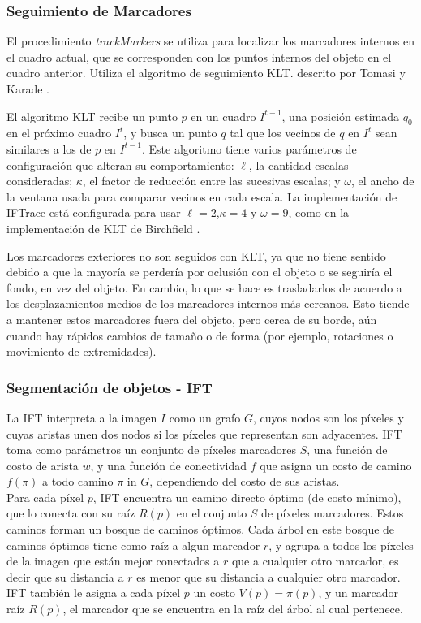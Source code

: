 \documentclass[a4paper,10pt]{article}
\begin{document}
\subsubsection{Seguimiento de Marcadores}

El procedimiento \textit{trackMarkers} se utiliza para localizar los marcadores
internos en el cuadro actual, que se corresponden con los puntos internos del objeto
en el cuadro anterior. Utiliza el algoritmo de seguimiento KLT. descrito por Tomasi y
Karade \cite{Tomasi91detectionand}.

El algoritmo KLT recibe un punto $p$ en un cuadro $I^{t-1}$, una posición estimada
$q_{0}$ en el próximo cuadro $I^{t}$, y busca un punto $q$ tal que los vecinos
de $q$ en $I^{t}$ sean similares a los de $p$ en $I^{t-1}$. Este algoritmo tiene
varios parámetros de configuración que alteran su comportamiento: $\ell$, la cantidad
escalas consideradas; $\kappa$, el factor de reducción entre las sucesivas escalas; y
$\omega$, el ancho de la ventana usada para comparar vecinos en cada escala.
La implementación de IFTrace está configurada para usar $\ell=2$,$\kappa=4$ y
$\omega=9$, como en la implementación de KLT de Birchfield \cite{Birchfield-KLT-implementation}.

Los marcadores exteriores no son seguidos con KLT, ya que no tiene sentido debido
a que la mayoría se perdería por oclusión con el objeto o se seguiría el fondo, en
vez del objeto. En cambio, lo que se hace es trasladarlos de acuerdo a los
desplazamientos medios de los marcadores internos más cercanos. Esto tiende
a mantener estos marcadores fuera del objeto, pero cerca de su borde, aún cuando
hay rápidos cambios de tamaño o de forma (por ejemplo, rotaciones o movimiento de extremidades).

\subsubsection{Segmentación de objetos - IFT}

La IFT interpreta a la imagen $I$ como un grafo $G$, cuyos nodos son los píxeles y cuyas
aristas unen dos nodos si los píxeles que representan son adyacentes. IFT toma como parámetros un conjunto de
píxeles marcadores $S$, una función de costo de arista $w$, y una función de
conectividad $f$ que asigna un costo de camino $f(\pi)$ a todo camino $\pi$ in $G$,
dependiendo del costo de sus aristas.\\
Para cada píxel $p$, IFT encuentra un camino directo óptimo (de costo mínimo), que lo
conecta con su raíz $R(p)$ en el conjunto $S$ de píxeles marcadores. Estos caminos forman un bosque de caminos
óptimos. Cada árbol en este bosque de caminos óptimos
tiene como raíz a algun marcador $r$, y agrupa a todos los píxeles de la imagen que
están mejor conectados a $r$ que a cualquier otro marcador, es decir que su distancia a $r$ es menor
que su distancia a cualquier otro marcador. IFT también le asigna a
cada píxel $p$ un costo $V(p) = \pi(p)$, y un marcador raíz $R(p)$, el marcador
que se encuentra en la raíz del árbol al cual pertenece.
\end{document}
